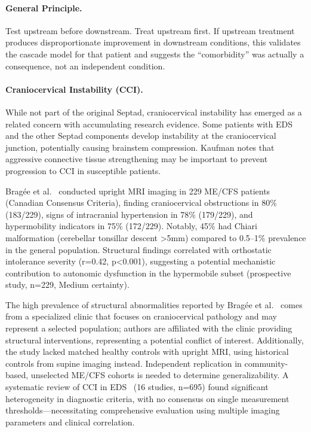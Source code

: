\paragraph{General Principle.}
Test upstream before downstream. Treat upstream first. If upstream treatment produces disproportionate improvement in downstream conditions, this validates the cascade model for that patient and suggests the ``comorbidity'' was actually a consequence, not an independent condition.

\paragraph{Craniocervical Instability (CCI).}
While not part of the original Septad, craniocervical instability has emerged as a related concern with accumulating research evidence. Some patients with EDS and the other Septad components develop instability at the craniocervical junction, potentially causing brainstem compression. Kaufman notes that aggressive connective tissue strengthening may be important to prevent progression to CCI in susceptible patients.

\begin{observation}
\label{obs:bragee-structural}
Bragée et al.~\cite{Bragee2020} conducted upright MRI imaging in 229 ME/CFS patients (Canadian Consensus Criteria), finding craniocervical obstructions in 80\% (183/229), signs of intracranial hypertension in 78\% (179/229), and hypermobility indicators in 75\% (172/229). Notably, 45\% had Chiari malformation (cerebellar tonsillar descent >5mm) compared to 0.5--1\% prevalence in the general population. Structural findings correlated with orthostatic intolerance severity (r=0.42, p<0.001), suggesting a potential mechanistic contribution to autonomic dysfunction in the hypermobile subset (prospective study, n=229, Medium certainty).
\end{observation}

\begin{warning}
\label{warn:bragee-selection}
The high prevalence of structural abnormalities reported by Bragée et al.~\cite{Bragee2020} comes from a specialized clinic that focuses on craniocervical pathology and may represent a selected population; authors are affiliated with the clinic providing structural interventions, representing a potential conflict of interest. Additionally, the study lacked matched healthy controls with upright MRI, using historical controls from supine imaging instead. Independent replication in community-based, unselected ME/CFS cohorts is needed to determine generalizability. A systematic review of CCI in EDS~\cite{Lohkamp2022} (16 studies, n=695) found significant heterogeneity in diagnostic criteria, with no consensus on single measurement thresholds---necessitating comprehensive evaluation using multiple imaging parameters and clinical correlation.
\end{warning}

